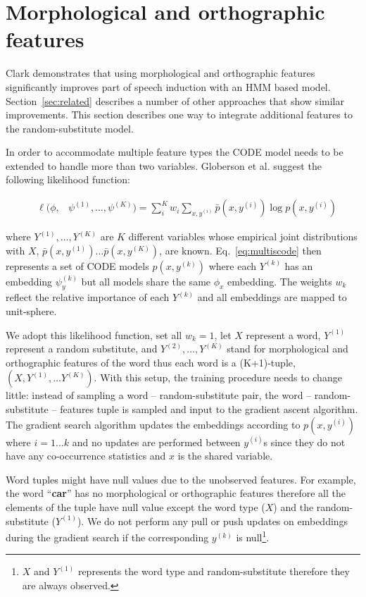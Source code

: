 \section{Morphological and orthographic features}
\label{sec:feat}

Clark  demonstrates that
using morphological and orthographic features significantly improves
part of speech induction with an HMM based model.
Section~\ref{sec:related} describes a number of other approaches that
show similar improvements.  This section describes one way to
integrate additional features to the random-substitute model.

In order to accommodate multiple feature types the CODE model needs to
be extended to handle more than two variables.  Globerson et
al.  suggest the following
likelihood function:

\begin{eqnarray}
&\ell(\phi,& \psi^{(1)}, \ldots, \psi^{(K)}) = \label{eq:multiscode} \sum_i^K w_i \sum_{x,y^{(i)}} \bar{p}(x,y^{(i)}) \log p(x,y^{(i)})
\end{eqnarray}

\noindent where $Y^{(1)}, \ldots, Y^{(K)}$ are $K$ different variables
whose empirical joint distributions with $X$,
$\bar{p}(x,y^{(1)})\ldots\bar{p}(x,y^{(K)})$, are known.
Eq.~\ref{eq:multiscode} then represents a set of CODE models
$p(x,y^{(k)})$ where each $Y^{(k)}$ has an embedding $\psi_y^{(k)}$
but all models share the same $\phi_x$ embedding.  The weights $w_k$
reflect the relative importance of each $Y^{(k)}$ and all embeddings
are mapped to unit-sphere.

We adopt this likelihood function, set all $w_k=1$, let $X$ represent
a word, $Y^{(1)}$ represent a random substitute, and $Y^{(2)}, \ldots,
Y^{(K)}$ stand for morphological and orthographic features of the word
thus each word is a (K+1)-tuple, $(X, Y^{(1)}, \hdots Y^{(K)})$.  With
this setup, the training procedure needs to change little: instead of
sampling a word -- random-substitute pair, the word --
random-substitute -- features tuple is sampled and input to the
gradient ascent algorithm.  The gradient search algorithm updates the
embeddings according to $p(x,y^{(i)})$ where $i=1\hdots k$ and no
updates are performed between $y^{(i)}$s since they do not have any
co-occurrence statistics and $x$ is the shared variable.

Word tuples might have null values due to the unobserved features.
For example, the word ``\textbf{car}'' has no morphological or
orthographic features therefore all the elements of the tuple have
null value except the word type ($X$) and the random-substitute
($Y^{(1)}$).  We do not perform any pull or push updates on embeddings
during the gradient search if the corresponding $y^{(k)}$ is
null\footnote{$X$ and $Y^{(1)}$ represents the word type and
  random-substitute therefore they are always observed.}.

